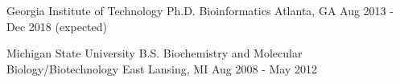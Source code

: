 \vspace{1.0mm}

\begin{cventries}

  \cventry
  	{Georgia Institute of Technology} %
    {Ph.D. Bioinformatics \scriptsize{}} %
    {Atlanta, GA} %
    {Aug 2013 - Dec 2018 \tiny {(expected)}} %
    {}

\vspace{-1.2em}

  \cventry
  	{Michigan State University} %
    {B.S. Biochemistry and Molecular Biology/Biotechnology \scriptsize{}} %
    {East Lansing, MI} %
    {Aug 2008 - May 2012} %
    {}
	
\vspace{-2em}


\end{cventries}
